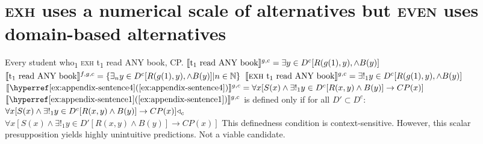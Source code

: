 \section{{\scshape exh} uses a numerical scale of alternatives but {\scshape even} uses domain-based alternatives}
\pex[nopreamble=true]%
\a{} Every student who\textsubscript{1} {\scshape exh} t\textsubscript{1} read \MakeUppercase{any} book, CP.
\a{} $\intension[g,c]{t\textsubscript{1} read ANY book}=\exists{y\in D^c}[R(g(1),y),\land B(y)]$
\a{} $\intension[f,g,c]{t\textsubscript{1} read ANY book}=\{\exists_n{y\in D^c}[R(g(1),y),\land B(y)]|n\in\mathbb{N}\}$
\a{} $\intension[g,c]{{\scshape exh} t\textsubscript{1} read ANY book}=\exists!_1{y\in D^c}[R(g(1),y),\land B(y)]$
\a{} $\intension[g,c]{\refex{appendix-sentence4}}=\forall{x}[S(x)\land\exists!_1{y\in D^c}[R(x,y)\land B(y)]\rightarrow CP(x)]$
\a{} $\intension[g,c]{\refex{appendix-sentence1}}$ is defined only if for all $D'\subset D^c$:\\$\forall{x}[S(x)\land\exists!_1{y\in D^c}[R(x,y)\land B(y)]\rightarrow CP(x)]\lprob_c$\\\emptyfill$\forall{x}[S(x)\land\exists!_1{y\in D'}[R(x,y)\land B(y)]\rightarrow CP(x)]$
\xe
This definedness condition is context-sensitive. However, this scalar presupposition yields highly unintuitive predictions. Not a viable candidate.
